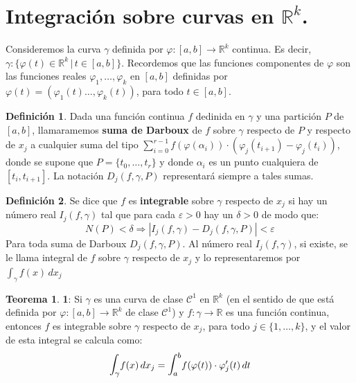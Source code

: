 \documentclass[12pt,twoside]{report}
\newcommand{\bbint}{\mathlarger{\mathlarger{\int}}}
\theoremstyle{azul}
\theoremstyle{azul2}
\theoremstyle{plain}
\theoremstyle{definition}
\newtheorem{defin}{Definición}[chapter]
\newtheorem*{theo}{Teorema}
\theoremstyle{remark}
\begin{document}
\section{Integración sobre curvas en $\mathbb{R}^k$.}
Consideremos la curva $\gamma$ definida por $\varphi: [a,b]\to \mathbb{R}^k$ continua. Es decir, $\gamma: \{\varphi(t)\in \mathbb{R}^k\,|\, t\in  [a,b]\} $. Recordemos que las funciones componentes de $\varphi$ son las funciones reales $\varphi_1, \ldots, \varphi_k$ en $[a,b]$ definidas por $\varphi(t)=(\varphi_1(t)\ldots,\varphi_k(t))$, para todo $t\in [a,b]$.
\begin{defin}
Dada una función continua $f$ dedinida en $\gamma$ y  una partición $P$ de $[a,b]$, llamaramemos \textbf{suma de Darboux} de $f$ sobre $\gamma$ respecto de $P$ y respecto de $x_j$ a cualquier suma del tipo $\sum_{i=0}^{r-1} f(\varphi(\alpha_i))\cdot (\varphi_j(t_{i+1})-\varphi_j(t_i))$, donde se supone que $P=\{t_0,\ldots,t_r\}$ y donde $\alpha_i$ es un  punto cualquiera de $[t_i,t_{i+1}]$. La notación $D_j(f,\gamma,P)$ representará siempre a tales sumas.

\end{defin}
\begin{defin}
Se dice que $f$ es \textbf{integrable} sobre $\gamma$ respecto de $x_j$ si hay un número real $I_j(f,\gamma)$ tal que para cada $\varepsilon>0$ hay un $\delta>0$ de modo que:
$$N(P)<\delta \Rightarrow |I_j(f,\gamma)-D_j(f,\gamma,P)|<\varepsilon$$
Para toda suma de Darboux $D_j(f,\gamma,P)$. Al número real $I_j(f,\gamma)$, si existe, se le llama integral de $f$ sobre $\gamma$ respecto de $x_j$ y lo representaremos por $\int_{\gamma}f(x) \, dx_j$
\end{defin}
\begin{theo} \label{teo11}
\textbf{1}: Si $\gamma$ es una curva de clase $\mathcal{C}^1$ en $\mathbb{R}^k$ (en el sentido de que está definida por $\varphi: [a,b]\to \mathbb{R}^k$ de clase $\mathcal{C}^1$) y $f:\gamma\to\mathbb{R}$ es una función continua, entonces $f$ es integrable sobre $\gamma$ respecto de $x_j$, para todo $j\in\{1,\ldots,k\}$, y el valor de esta integral se calcula como:
$$\bbint_{\gamma}f(x) \, dx_j=\bbint_a^b f(\varphi(t))\cdot \varphi_j'(t) \, dt$$
\end{theo}
\end{document}

